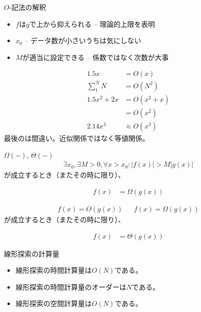\documentclass{beamer}
\begin{document}
\begin{frame}[fragile]{$O$-記法の解釈}{}

\begin{itemize}%
\item $f$は$g$で上から抑えられる -- 理論的上限を表明
\item $x_0$ -- データ数が小さいうちは気にしない
\item $M$が適当に設定できる -- 係数ではなく次数が大事
\end{itemize}

\begin{align*}
1.5 x & = O(x) \\
\sum_{1}^{N} N & = O(N^2) \\
1.5x^2 + 2x & = O(x^2 + x) \\
         & = O(x^2) \\
2.14x^3 & \approx O(x^3)
\end{align*}
最後のは間違い。近似関係ではなく等値関係。

\end{frame}

\begin{frame}[fragile]{$\Omega(-)$, $\Theta(-)$}{}
\begin{align*}
\exists x_{0}, \exists M > 0,  \forall x > x_{0} : |f(x)| > M | g(x) |
\end{align*}
が成立するとき（またその時に限り）、

\begin{align*}
f(x) &= \Omega(g(x))
\end{align*}

\vfill
\begin{align*}
f(x) = O(g(x)) && f(x) = \Omega(g(x))
\end{align*}
が成立するとき（またその時に限り）、

\begin{align*}
f(x) &= \Theta(g(x))
\end{align*}
\end{frame}

\begin{frame}[fragile]{線形探索の計算量}{}

\begin{itemize}%
\item 線形探索の時間計算量は$O(N)$である。
\item 線形探索の時間計算量のオーダーは$N$である。
\item 線形探索の空間計算量は$O(N)$である\footnotemark。
\end{itemize}


\end{frame}
\end{document}
